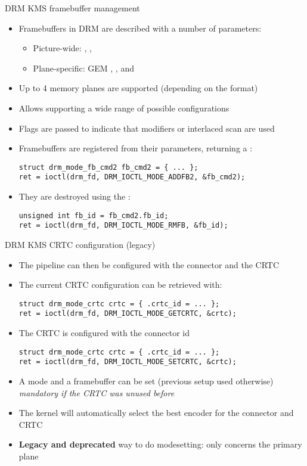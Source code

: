 \begin{frame}[fragile]{DRM KMS framebuffer management}
  \begin{itemize}
  \item Framebuffers in DRM are described with a number of parameters:
    \begin{itemize}
    \item Picture-wide: , , 
    \item Plane-specific: GEM , ,  and 
    \end{itemize}
  \item Up to 4 memory planes are supported (depending on the format)
  \item Allows supporting a wide range of possible configurations
  \item Flags are passed to indicate that modifiers or interlaced scan are used
  \item Framebuffers are registered from their parameters, returning a :
  \begin{verbatim}
struct drm_mode_fb_cmd2 fb_cmd2 = { ... };
ret = ioctl(drm_fd, DRM_IOCTL_MODE_ADDFB2, &fb_cmd2);
  \end{verbatim}
  \item They are destroyed using the :
  \begin{verbatim}
unsigned int fb_id = fb_cmd2.fb_id;
ret = ioctl(drm_fd, DRM_IOCTL_MODE_RMFB, &fb_id);
  \end{verbatim}
  \end{itemize}
\end{frame}

\begin{frame}[fragile]{DRM KMS CRTC configuration (legacy)}
  \begin{itemize}
  \item The pipeline can then be configured with the connector and the CRTC
  \item The current CRTC configuration can be retrieved with:
  \begin{verbatim}
struct drm_mode_crtc crtc = { .crtc_id = ... };
ret = ioctl(drm_fd, DRM_IOCTL_MODE_GETCRTC, &crtc);
  \end{verbatim}
  \item The CRTC is configured with the connector id
  \begin{verbatim}
struct drm_mode_crtc crtc = { .crtc_id = ... };
ret = ioctl(drm_fd, DRM_IOCTL_MODE_SETCRTC, &crtc);
  \end{verbatim}
  \item A mode and a framebuffer can be set (previous setup used otherwise)\\
  \textit{mandatory if the CRTC was unused before}
  \item The kernel will automatically select the best encoder for the connector and CRTC
  \item \textbf{Legacy and deprecated} way to do modesetting: only concerns the primary plane
  \end{itemize}
\end{frame}

